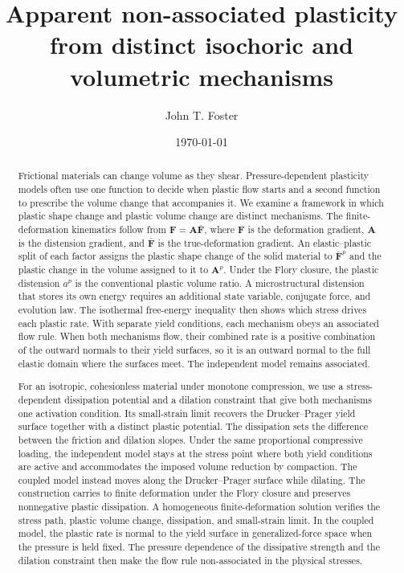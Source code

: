 \documentclass[11pt]{article}
\title{Apparent non-associated plasticity from distinct isochoric and
volumetric mechanisms}
\author{John T. Foster}
\date{\today}
\newcommand{\mbf}[1]{\mathbf{#1}}
\begin{document}
\maketitle

\begin{abstract}
	Frictional materials can change volume as they shear. Pressure-dependent
	plasticity models often use one function to decide when plastic flow starts
	and a second function to prescribe the volume change that accompanies it.
	We examine a framework in which plastic shape change and plastic volume
	change are distinct mechanisms. The finite-deformation kinematics follow
	from \(\mbf F=\mbf A\bar{\mbf F}\), where \(\mbf F\) is the deformation
	gradient, \(\mbf A\) is the distension gradient, and \(\bar{\mbf F}\) is the
	true-deformation gradient. An elastic--plastic split of each factor assigns
	the plastic shape change of the solid material to \(\bar{\mbf F}^{p}\) and
	the plastic change in the volume assigned to it to \(\mbf A^{p}\). Under
	the Flory closure, the plastic distension \(a^p\) is the conventional
	plastic volume ratio. A microstructural distension that stores its own
	energy requires an additional state variable, conjugate force, and
	evolution law.
	The isothermal free-energy inequality then shows which stress drives each
	plastic rate. With separate yield conditions, each mechanism obeys an
	associated flow rule. When both mechanisms flow, their combined rate is a
	positive combination of the outward normals to their yield surfaces, so it
	is an outward normal to the full elastic domain where the surfaces meet.
	The independent model remains associated.

	For an isotropic, cohesionless material under monotone compression, we use a
	stress-dependent dissipation potential and a dilation constraint that give
	both mechanisms one activation condition.  Its small-strain limit recovers
	the Drucker--Prager yield surface together with a distinct plastic
	potential. The dissipation sets the difference between the friction and
	dilation slopes. Under the same proportional compressive loading, the
	independent model stays at the stress point where both yield conditions are
	active and accommodates the imposed volume reduction by compaction. The
	coupled model instead moves along the Drucker--Prager surface while
	dilating. The construction carries to finite deformation under the Flory
	closure and preserves nonnegative plastic dissipation. A homogeneous
	finite-deformation solution verifies the stress path, plastic volume change,
	dissipation, and small-strain limit. In the coupled model, the plastic rate
	is normal to the yield surface in generalized-force space when the pressure
	is held fixed. The pressure dependence of the dissipative strength and the
	dilation constraint then make the flow rule non-associated in the physical
	stresses.
\end{abstract}
\end{document}
